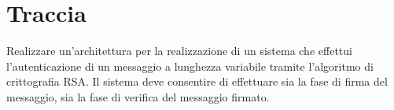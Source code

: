 %

\section{Traccia}

Realizzare un'architettura per la realizzazione di un sistema che
effettui l\textquoteright autenticazione di un messaggio a lunghezza
variabile tramite l\textquoteright algoritmo di crittografia RSA.
Il sistema deve consentire di effettuare sia la fase di firma del
messaggio, sia la fase di verifica del messaggio firmato. %

